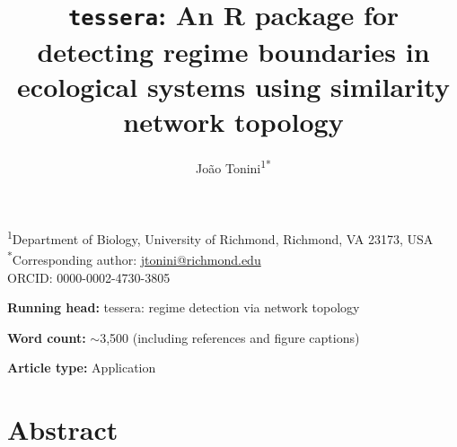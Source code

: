 \documentclass[12pt]{article}
\title{\texttt{tessera}: An R package for detecting regime boundaries in ecological systems using similarity network topology}
\author{Jo\~{a}o Tonini\textsuperscript{1*}}
\date{}
\begin{document}
\maketitle

\noindent\textsuperscript{1}Department of Biology, University of Richmond, Richmond, VA 23173, USA\\
\noindent\textsuperscript{*}Corresponding author: \href{mailto:jtonini@richmond.edu}{jtonini@richmond.edu}\\
\noindent ORCID: 0000-0002-4730-3805

\vspace{1em}
\noindent\textbf{Running head:} tessera: regime detection via network topology

\vspace{1em}
\noindent\textbf{Word count:} $\sim$3,500 (including references and figure captions)

\vspace{1em}
\noindent\textbf{Article type:} Application

\newpage

\section*{Abstract}
\end{document}
